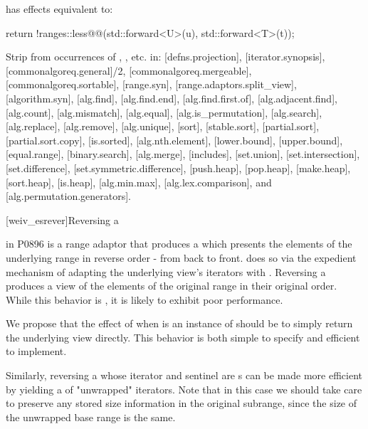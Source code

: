 \begin{itemdescr}
\pnum
{} has effects equivalent to:
\begin{codeblock}
return !ranges::less@\removed{<>}@{}(std::forward<U>(u), std::forward<T>(t));
\end{codeblock}
\end{itemdescr}

Strip \tcode{<>} from occurrences of ,
, etc. in: [defns.projection], [iterator.synopsis],
[commonalgoreq.general]/2, [commonalgoreq.mergeable], [commonalgoreq.sortable],
[range.syn], [range.adaptors.split_view], [algorithm.syn], [alg.find],
[alg.find.end], [alg.find.first.of], [alg.adjacent.find], [alg.count],
[alg.mismatch], [alg.equal], [alg.is_permutation], [alg.search], [alg.replace],
[alg.remove], [alg.unique], [sort], [stable.sort], [partial.sort],
[partial.sort.copy], [is.sorted], [alg.nth.element], [lower.bound],
[upper.bound], [equal.range], [binary.search], [alg.merge], [includes],
[set.union], [set.intersection], [set.difference], [set.symmetr\-ic.difference],
[push.heap], [pop.heap], [make.heap], [sort.heap], [is.heap], [alg.min.max],
[alg.lex.comparison], and [alg.permutation.generators].


[weiv_esrever]{Reversing a }

 in P0896 is a range adaptor that produces a
 which presents the elements of the underlying range
in reverse order - from back to front.  does so via
the expedient mechanism of adapting the underlying view's iterators with
. Reversing a  produces a view
of the elements of the original range in their original order. While this
behavior is , it is likely to exhibit poor performance.

We propose that the effect of  when  is an
instance of  should be to simply return the underlying view
directly. This behavior is both simple to specify and efficient to implement.

Similarly, reversing a  whose iterator and sentinel are
s can be made more efficient by yielding a
 of "unwrapped" iterators. Note that in this case we should
take care to preserve any stored size information in the original subrange,
since the size of the unwrapped base range is the same.

